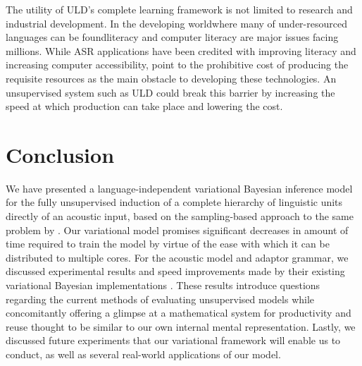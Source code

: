 \documentclass[12pt,letterpaper]{article}
\begin{document}
The utility of ULD's complete learning framework is not limited to research and industrial development. In the developing world\textemdash where many of under-resourced languages can be found\textemdash literacy and computer literacy are major issues facing millions. While ASR applications have been credited with improving literacy \citep{adams:2005} and increasing computer accessibility, \citet{plauche:2006} point to the prohibitive cost of producing the requisite resources as the main obstacle to developing these technologies. An unsupervised system such as ULD could break this barrier by increasing the speed at which production can take place and lowering the cost. 

\section{Conclusion} 
We have presented a language-independent variational Bayesian inference model for the fully unsupervised induction of a complete hierarchy of linguistic units directly of an acoustic input, based on the sampling-based approach to the same problem by \citet{lee:2015}. Our variational model promises significant decreases in amount of time required to train the model by virtue of the ease with which it can be distributed to multiple cores. For the acoustic model and adaptor grammar, we discussed experimental results and speed improvements made by their existing variational Bayesian implementations \citep{ondel:2016, cohen:2010, zhai:2014}. These results introduce questions regarding the current methods of evaluating unsupervised models while concomitantly offering a glimpse at a mathematical system for productivity and reuse thought to be similar to our own internal mental representation. Lastly, we discussed future experiments that our variational framework will enable us to conduct, as well as several real-world applications of our model. 


\appendix



\newpage 



\end{document}
